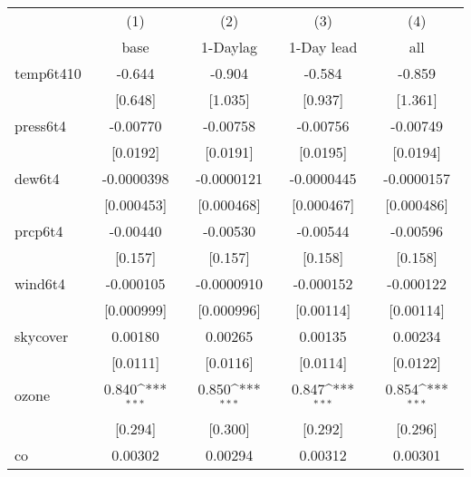 {
\def\sym#1{\ifmmode^{#1}\else\(^{#1}\)\fi}
\begin{tabular}{l*{4}{c}}
\hline\hline
            &\multicolumn{1}{c}{(1)}&\multicolumn{1}{c}{(2)}&\multicolumn{1}{c}{(3)}&\multicolumn{1}{c}{(4)}\\
            &\multicolumn{1}{c}{base}&\multicolumn{1}{c}{1-Daylag}&\multicolumn{1}{c}{1-Day lead}&\multicolumn{1}{c}{all}\\
\hline
temp6t410   &      -0.644         &      -0.904         &      -0.584         &      -0.859         \\
            &     [0.648]         &     [1.035]         &     [0.937]         &     [1.361]         \\
[1em]
press6t4    &    -0.00770         &    -0.00758         &    -0.00756         &    -0.00749         \\
            &    [0.0192]         &    [0.0191]         &    [0.0195]         &    [0.0194]         \\
[1em]
dew6t4      &  -0.0000398         &  -0.0000121         &  -0.0000445         &  -0.0000157         \\
            &  [0.000453]         &  [0.000468]         &  [0.000467]         &  [0.000486]         \\
[1em]
prcp6t4     &    -0.00440         &    -0.00530         &    -0.00544         &    -0.00596         \\
            &     [0.157]         &     [0.157]         &     [0.158]         &     [0.158]         \\
[1em]
wind6t4     &   -0.000105         &  -0.0000910         &   -0.000152         &   -0.000122         \\
            &  [0.000999]         &  [0.000996]         &   [0.00114]         &   [0.00114]         \\
[1em]
skycover    &     0.00180         &     0.00265         &     0.00135         &     0.00234         \\
            &    [0.0111]         &    [0.0116]         &    [0.0114]         &    [0.0122]         \\
[1em]
ozone       &       0.840\sym{***}&       0.850\sym{***}&       0.847\sym{***}&       0.854\sym{***}\\
            &     [0.294]         &     [0.300]         &     [0.292]         &     [0.296]         \\
[1em]
co          &     0.00302         &     0.00294         &     0.00312         &     0.00301         \\

\end{tabular}}
